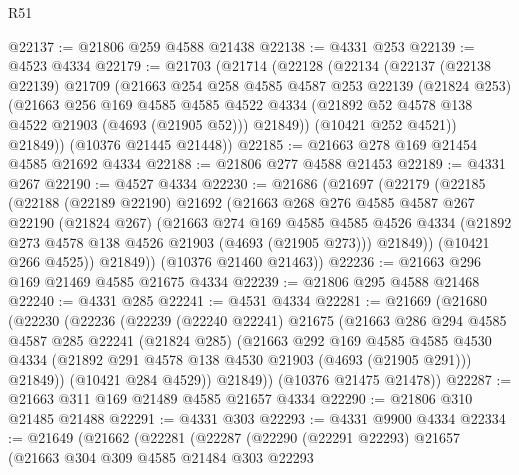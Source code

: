 \begin{lexlean}{R51}
\begin{coremodule}
@22137 := @21806 @259 @4588 @21438
@22138 := @4331 @253
@22139 := @4523 @4334
@22179 := @21703
    (@21714
      (@22128
        (@22134
          (@22137
            (@22138 @22139)
            @21709
            (@21663
              @254
              @258
              @4585
              @4587
              @253
              @22139
              (@21824 @253)
              (@21663
                @256
                @169
                @4585
                @4585
                @4522
                @4334
                (@21892 @52 @4578 @138 @4522 @21903 (@4693 (@21905 @52)))
                @21849))
            (@10421 @252 @4521))
          @21849))
      (@10376 @21445 @21448))
@22185 := @21663 @278 @169 @21454 @4585 @21692 @4334
@22188 := @21806 @277 @4588 @21453
@22189 := @4331 @267
@22190 := @4527 @4334
@22230 := @21686
    (@21697
      (@22179
        (@22185
          (@22188
            (@22189 @22190)
            @21692
            (@21663
              @268
              @276
              @4585
              @4587
              @267
              @22190
              (@21824 @267)
              (@21663
                @274
                @169
                @4585
                @4585
                @4526
                @4334
                (@21892 @273 @4578 @138 @4526 @21903 (@4693 (@21905 @273)))
                @21849))
            (@10421 @266 @4525))
          @21849))
      (@10376 @21460 @21463))
@22236 := @21663 @296 @169 @21469 @4585 @21675 @4334
@22239 := @21806 @295 @4588 @21468
@22240 := @4331 @285
@22241 := @4531 @4334
@22281 := @21669
    (@21680
      (@22230
        (@22236
          (@22239
            (@22240 @22241)
            @21675
            (@21663
              @286
              @294
              @4585
              @4587
              @285
              @22241
              (@21824 @285)
              (@21663
                @292
                @169
                @4585
                @4585
                @4530
                @4334
                (@21892 @291 @4578 @138 @4530 @21903 (@4693 (@21905 @291)))
                @21849))
            (@10421 @284 @4529))
          @21849))
      (@10376 @21475 @21478))
@22287 := @21663 @311 @169 @21489 @4585 @21657 @4334
@22290 := @21806 @310 @21485 @21488
@22291 := @4331 @303
@22293 := @4331 @9900 @4334
@22334 := @21649
    (@21662
      (@22281
        (@22287
          (@22290
            (@22291 @22293)
            @21657
            (@21663
              @304
              @309
              @4585
              @21484
              @303
              @22293

\end{coremodule}
\end{lexlean}
